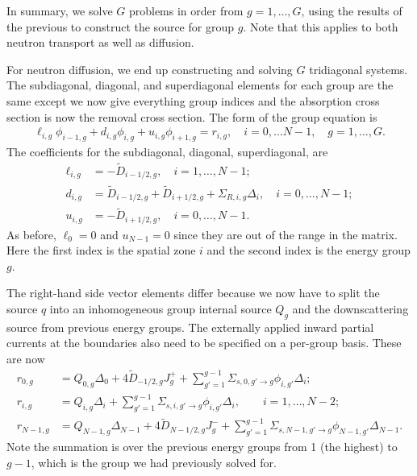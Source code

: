 In summary, we solve $G$ problems in order from $g = 1, \ldots, G$, using the results of the previous to construct the source for group $g$. Note that this applies to both neutron transport as well as diffusion.

For neutron diffusion, we end up constructing and solving $G$ tridiagonal systems. The subdiagonal, diagonal, and superdiagonal elements for each group are the same except we now give everything group indices and the absorption cross section is now the removal cross section. The form of the group equation is
\begin{align}
  \ell_{i,g} \phi_{i-1,g} + d_{i,g} \phi_{i,g} + u_{i,g} \phi_{i+1,g} = r_{i,g} , \quad i = 0, \ldots N-1, \quad g = 1, \ldots, G.
\end{align}
The coefficients for the subdiagonal, diagonal, superdiagonal, are
\begin{subequations}
\begin{align}
  \ell_{i,g}	&= -\widetilde{D}_{i-1/2,g}, \quad i = 1, \ldots, N-1; \\
  d_{i,g}		&=  \widetilde{D}_{i-1/2,g} + \widetilde{D}_{i+1/2,g}  + \Sigma_{R,i,g} \Delta_i, \quad i = 0, \ldots, N-1; \\
  u_{i,g}		&= -\widetilde{D}_{i+1/2,g}, \quad i = 0, \ldots, N-1.
\end{align} 
\end{subequations}
As before, $\ell_0 = 0$ and $u_{N-1} = 0$ since they are out of the range in the matrix. Here the first index is the spatial zone $i$ and the second index is the energy group $g$. 

The right-hand side vector elements differ because we now have to split the source $q$ into an inhomogeneous group internal source $Q_g$ and the downscattering source from previous energy groups. The externally applied inward partial currents at the boundaries also need to be specified on a per-group basis. These are now
\begin{subequations}
\begin{align}
  r_{0,g}		&= Q_{0,g} \Delta_0 + 4 \widetilde{D}_{-1/2,g} J_g^+ + \sum_{g'=1}^{g-1} \Sigma_{s,0,g' \rightarrow g} \phi_{i,g'} \Delta_i; \\
  r_{i,g}		&= Q_{i,g} \Delta_i + \sum_{g'=1}^{g-1} \Sigma_{s,i,g' \rightarrow g} \phi_{i,g'} \Delta_i, \qquad i = 1, \ldots, N-2; \\
  r_{N-1,g}		&= Q_{N-1,g} \Delta_{N-1} + 4 \widetilde{D}_{N-1/2,g} J_g^- + \sum_{g'=1}^{g-1} \Sigma_{s,N-1,g' \rightarrow g} \phi_{N-1,g'} \Delta_{N-1} .
\end{align} 
\end{subequations}
Note the summation is over the previous energy groups from 1 (the highest) to $g-1$, which is the group we had previously solved for. 

